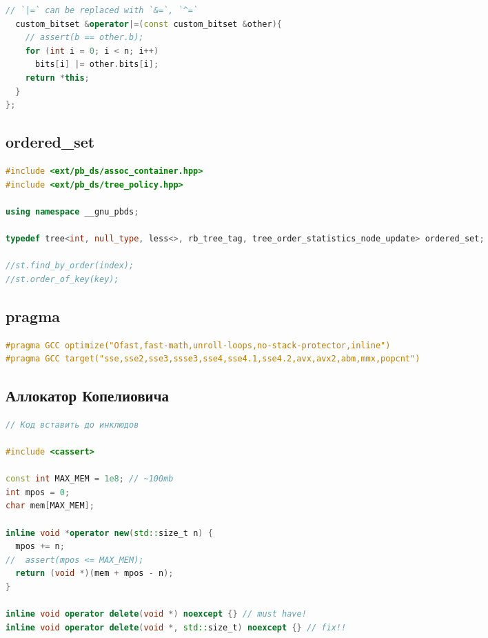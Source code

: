 \documentclass[9pt,a4paper,landscape,twosided]{extarticle}
\begin{document}
\begin{multicols*}{3}
\begin{lstlisting}[language=C++]
  // `|=` can be replaced with `&=`, `^=`
  custom_bitset &operator|=(const custom_bitset &other){
    // assert(b == other.b);
    for (int i = 0; i < n; i++)
      bits[i] |= other.bits[i];
    return *this;
  }
};
\end{lstlisting}

\subsection{ordered\_set}
\begin{lstlisting}[language=C++]
#include <ext/pb_ds/assoc_container.hpp>
#include <ext/pb_ds/tree_policy.hpp>

using namespace __gnu_pbds;

typedef tree<int, null_type, less<>, rb_tree_tag, tree_order_statistics_node_update> ordered_set;

//st.find_by_order(index);
//st.order_of_key(key);

\end{lstlisting}

\subsection{pragma}
\begin{lstlisting}[language=C++]
#pragma GCC optimize("Ofast,fast-math,unroll-loops,no-stack-protector,inline")
#pragma GCC target("sse,sse2,sse3,ssse3,sse4,sse4.1,sse4.2,avx,avx2,abm,mmx,popcnt")

\end{lstlisting}

\subsection{Аллокатор Копелиовича}
\begin{lstlisting}[language=C++]
// Код вставить до инклюдов

#include <cassert>

const int MAX_MEM = 1e8; // ~100mb
int mpos = 0;
char mem[MAX_MEM];

inline void *operator new(std::size_t n) {
  mpos += n;
//  assert(mpos <= MAX_MEM);
  return (void *)(mem + mpos - n);
}

inline void operator delete(void *) noexcept {} // must have!
inline void operator delete(void *, std::size_t) noexcept {} // fix!!
\end{lstlisting}


\end{multicols*}
\end{document}
